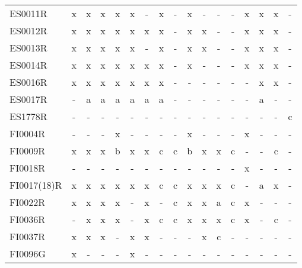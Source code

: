 \begin{table}
{{\begin{tabular}{l|cccccccccccccccc}
        ES0011R &  x &   x &    x &      x &   x &    - &    x &    - &      x &    - &    - &   - &      x &    x &    x &     - \\
        ES0012R &  x &   x &    x &      x &   x &    x &    x &    - &      x &    x &    - &   - &      x &    x &    x &     - \\
        ES0013R &  x &   x &    x &      x &   x &    - &    x &    - &      x &    x &    - &   - &      x &    x &    x &     - \\
        ES0014R &  x &   x &    x &      x &   x &    x &    x &    - &      x &    - &    - &   - &      x &    x &    x &     - \\
        ES0016R &  x &   x &    x &      x &   x &    x &    x &    - &      - &    - &    - &   - &      - &    x &    x &     - \\
        ES0017R &  - &   a &    a &      a &   a &    a &    a &    - &      - &    - &    - &   - &      - &    a &    - &     - \\
        ES1778R &  - &   - &    - &      - &   - &    - &    - &    - &      - &    - &    - &   - &      - &    - &    - &     c \\
        FI0004R &  - &   - &    - &      x &   - &    - &    - &    - &      x &    - &    - &   - &      x &    - &    - &     - \\
        FI0009R &  x &   x &    x &      b &   x &    x &    c &    c &      b &    x &    x &   c &      - &    - &    c &     - \\
        FI0018R &  - &   - &    - &      - &   - &    - &    - &    - &      - &    - &    - &   - &      x &    - &    - &     - \\
FI0017(18)R &  x &   x &    x &      x &   x &    x &    c &    c &      x &    x &    x &   c &      - &    a &    x &     - \\
        FI0022R &  x &   x &    x &      x &   - &    x &    - &    c &      x &    x &    a &   c &      x &    - &    - &     - \\
        FI0036R &  - &   x &    x &      x &   - &    x &    c &    c &      x &    x &    x &   c &      x &    - &    c &     - \\
        FI0037R &  x &   x &    x &      - &   x &    x &    - &    - &      - &    x &    c &   - &      - &    - &    - &     - \\
        FI0096G &  x &   - &    - &      - &   x &    - &    - &    - &      - &    - &    - &   - &      - &    - &    - &     - \\
\bottomrule
\end{tabular}
 }}
 \end{table}




